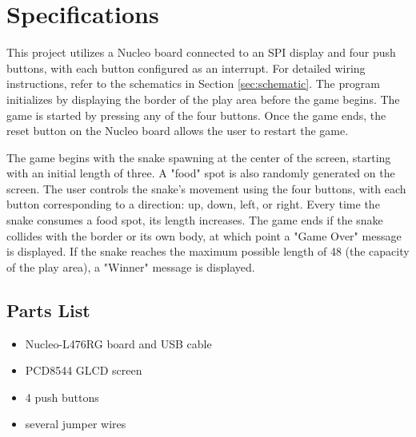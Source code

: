 \section{Specifications}
\label{sec:specifications}


    This project utilizes a Nucleo board connected to an SPI display and four push buttons, with each button configured as an interrupt. For detailed wiring instructions, refer to the schematics in Section \ref{sec:schematic}. The program initializes by displaying the border of the play area before the game begins. The game is started by pressing any of the four buttons. Once the game ends, the reset button on the Nucleo board allows the user to restart the game.

    The game begins with the snake spawning at the center of the screen, starting with an initial length of three. A "food" spot is also randomly generated on the screen. The user controls the snake's movement using the four buttons, with each button corresponding to a direction: up, down, left, or right. Every time the snake consumes a food spot, its length increases. The game ends if the snake collides with the border or its own body, at which point a "Game Over" message is displayed. If the snake reaches the maximum possible length of 48 (the capacity of the play area), a "Winner" message is displayed.
     
     

\subsection{Parts List}

\begin{itemize}
    \item Nucleo-L476RG board and USB cable
    \item PCD8544 GLCD screen
    \item 4 push buttons
    \item several jumper wires
\end{itemize}


